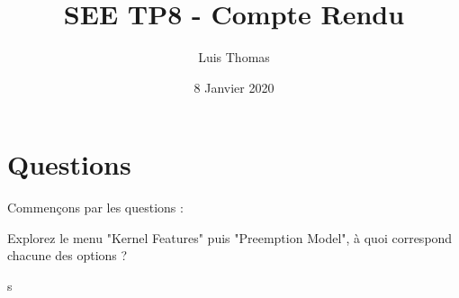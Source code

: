 \documentclass{article}
\title{SEE TP8 - Compte Rendu}
\author{Luis Thomas }
\date{8 Janvier 2020}
\begin{document}
\maketitle

\newpage
\tableofcontents

\newpage
\section{Questions}

Commençons par les questions :

Explorez le menu "Kernel Features" puis "Preemption Model", à quoi correspond chacune des options ?

s
\end{document}
